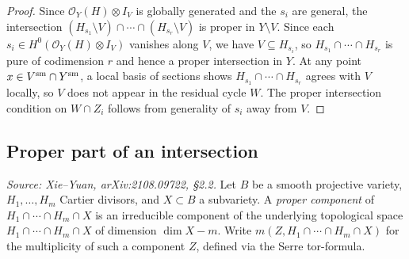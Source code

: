\begin{proof}
  Since \(\mathcal{O}_Y(H) \otimes I_V\) is globally generated and the \(s_i\) are general,
  the intersection \((H_{s_1} \setminus V) \cap \cdots \cap (H_{s_r} \setminus V)\) is proper
  in \(Y \setminus V\).  Since each \(s_i \in H^0(\mathcal{O}_Y(H) \otimes I_V)\) vanishes
  along \(V\), we have \(V \subseteq H_{s_i}\), so \(H_{s_1} \cap \cdots \cap H_{s_r}\) is
  pure of codimension \(r\) and hence a proper intersection in \(Y\).
  At any point \(x \in V^{\rm sm} \cap Y^{\rm sm}\), a local basis of sections shows
  \(H_{s_1} \cap \cdots \cap H_{s_r}\) agrees with \(V\) locally, so \(V\) does not appear
  in the residual cycle \(W\).
  The proper intersection condition on \(W \cap Z_i\) follows from generality of \(s_i\)
  away from \(V\).
\end{proof}

\subsection{Proper part of an intersection}

\begin{definition}
  \label{def:ProperComponent}
  \textit{Source: Xie--Yuan, arXiv:2108.09722, \S2.2.}
  Let \(B\) be a smooth projective variety, \(H_1,\dots,H_m\) Cartier divisors, and \(X \subset B\)
  a subvariety.
  A \emph{proper component} of \(H_1 \cap \cdots \cap H_m \cap X\) is an irreducible component
  of the underlying topological space \(H_1 \cap \cdots \cap H_m \cap X\) of dimension
  \(\dim X - m\).
  Write \(m(Z, H_1 \cap \cdots \cap H_m \cap X)\) for the multiplicity of such a component
  \(Z\), defined via the Serre tor-formula.
\end{definition}

